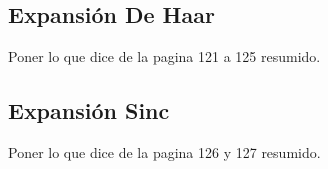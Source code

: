 \subsection{Expansión De Haar}

Poner lo que dice de la pagina 121 a 125 resumido.

\subsection{Expansión Sinc}

Poner lo que dice de la pagina 126 y 127 resumido.
